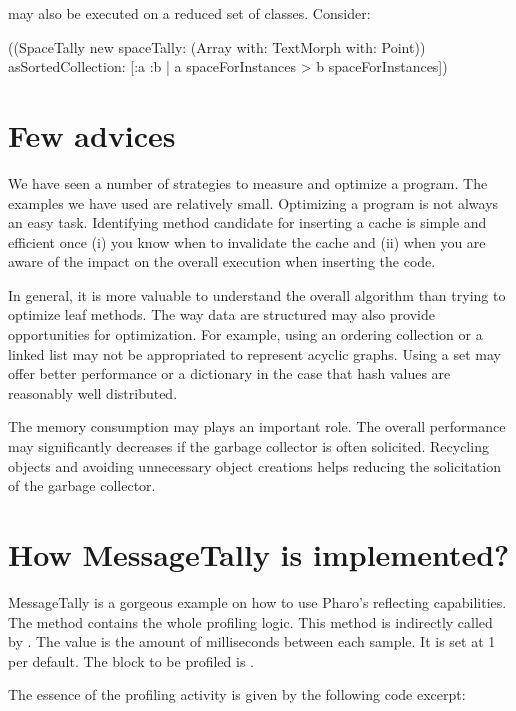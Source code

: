 \documentclass[a4paper,10pt,twoside]{book}
\begin{document}
 may also be executed on a reduced set of classes. Consider:

\begin{code}{}
((SpaceTally new spaceTally: (Array with: TextMorph with: Point)) 
	asSortedCollection: [:a :b | a spaceForInstances > b spaceForInstances]) 
\end{code}



\section{Few advices}

We have seen a number of strategies to measure and optimize a program. The examples we have used are relatively small. Optimizing a program is not always an easy task. Identifying method candidate for inserting a cache is simple and efficient once (i) you know when to invalidate the cache and (ii) when you are aware of the impact on the overall execution when inserting the code.

In general, it is more valuable to understand the overall algorithm than trying to optimize leaf methods. The way data are structured may also provide opportunities for optimization. For example, using an ordering collection or a linked list may not be appropriated to represent acyclic graphs. Using a set may offer better performance or a dictionary in the case that hash values are reasonably well distributed.

The memory consumption may plays an important role. The overall performance may significantly decreases if the garbage collector is often solicited. Recycling objects and avoiding unnecessary object creations helps reducing the solicitation of the garbage collector.

\section {How MessageTally is implemented?}

MessageTally is a gorgeous example on how to use Pharo's reflecting capabilities. The method  contains the whole profiling logic. This method is indirectly called by . The  value is the amount of milliseconds between each sample. It is set at 1 per default. The block to be profiled is .

The essence of the profiling activity is given by the following code excerpt:
\end{document}
